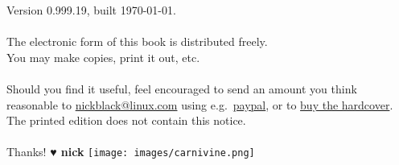 \clearpage
\noindent{}Version 0.999.19, built \today.\\
\\
The electronic form of this book is distributed freely.\\
You may make copies, print it out, etc.\\
\\
Should you find it useful, feel encouraged to send an amount you think reasonable to
  \href{mailto:nickblack@linux.com}{nickblack@linux.com} using
  e.g.\ \href{https://paypal.me/dankamongmen}{paypal},
  or to \href{https://goldandappelpub.com/pgo-quantitative.html}{buy the hardcover}.
The printed edition does not contain this notice.\\
\\
Thanks! {\textbf{♥ nick}}
\vfill\texttt{[image: images/carnivine.png]}\vfill
